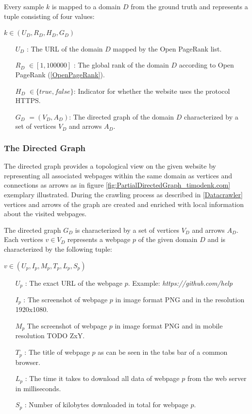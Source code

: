 Every sample $k$ is mapped to a domain $D$ from the ground truth and represents a tuple consisting of four values:

\begin{center}
$k \in (U_D,R_D,H_D,G_D)$
\begin{itemize}
	 \item[$U_D$]: The URL of the domain $D$ mapped by the Open PageRank list.
	\item[$R_D$] $\in [1, 100000]$ : The global rank of the domain $D$ according to Open PageRank (\ref{OpenPageRank}). 
    \item[$H_D$] $\in \{true, false\}$: Indicator for whether the website uses the protocol HTTPS.
    \item[$G_D$] $= (V_D, A_D)$: The directed graph of the domain $D$ characterized by a set of vertices $V_D$ and arrows $A_D$.
\end{itemize}
\end{center}

\subsubsection{The Directed Graph}
The directed graph provides a topological view on the given website by representing all associated webpages within the same domain as vertices and connections as arrows as in figure \ref{fig:PartialDirectedGraph_timodenk.com} exemplary illustrated. During the crawling process as described in \ref{Datacrawler} vertices and arrows of the graph are created and enriched with local information about the visited webpages.

The directed graph $G_D$ is characterized by a set of vertices $V_D$ and arrows $A_D$. Each vertices $v \in V_D$ represents a webpage $p$ of the given domain $D$ and is characterized by the following tuple:

\begin{center}
	$v \in (U_p, I_p, M_p,T_p, L_p, S_p)$
\begin{itemize}
	\item[$ U_p$] : The exact URL of the webpage $p$. Example: \textit{https://github.com/help}
	\item[$I_p$] : The screenshot of webpage $p$ in image format PNG and in the resolution 1920x1080.
	\item[$M_p$] The screenshot of webpage $p$ in image format PNG and in mobile resolution TODO ZxY.
	\item[$T_p$] : The title of webpage $p$ as can be seen in the tabs bar of a common browser.
	\item[$L_p$] : The time it takes to download all data of webpage $p$ from the web server in milliseconds.
	\item[$S_p$] : Number of kilobytes downloaded in total for webpage $p$.
\end{itemize}
\end{center}

